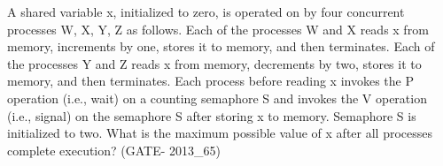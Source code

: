 \begin{questyle}
\begin{parts}
  \end{parts}

  \end{questyle}


\begin{questyle}

  \question  A shared variable x, initialized to zero, is operated on by four concurrent processes W, X, Y, Z as follows.
            Each of the processes W and X reads x from memory, increments by one, stores it to memory, and then terminates.
            Each of the processes Y and Z reads x from memory, decrements by two, stores it to memory, and then terminates.
            Each process before reading x invokes the P operation (i.e., wait) on a counting semaphore S and
            invokes the V operation (i.e., signal) on the semaphore S after storing x to memory.
            Semaphore S is initialized to two. What is the maximum possible value of x after all
            processes complete execution? (GATE- 2013\_65)

  \begin{oneparchoices}
  \end{oneparchoices}

  \end{questyle}




